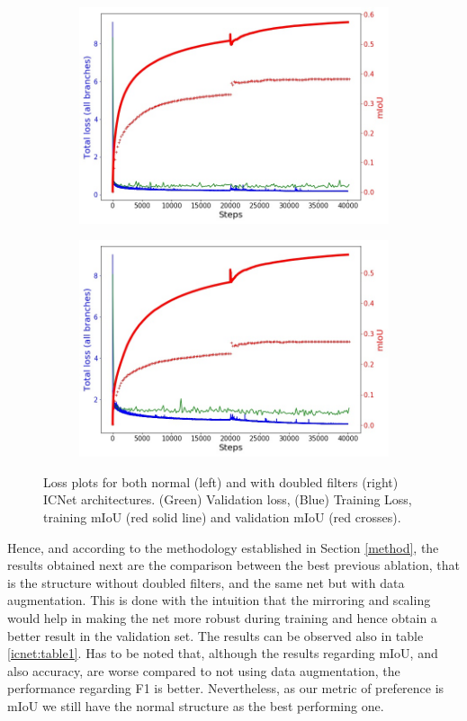 \documentclass[12pt,a4paper]{article}
\begin{document}
\begin{figure}
\centering
\begin{subfigure}{.5\textwidth}
  \centering
  \includegraphics[width=.95\linewidth]{icnet_res_1.jpg}
\end{subfigure}%
\begin{subfigure}{.5\textwidth}
  \centering
  \includegraphics[width=.95\linewidth]{icnet_res_2.jpg}
\end{subfigure}
\caption{Loss plots for both normal (left) and with doubled filters (right) ICNet architectures. (Green) Validation loss, (Blue) Training Loss,  training mIoU (red solid line) and validation mIoU (red crosses). }
\label{icnet:filters}
\end{figure}

Hence, and according to the methodology established in Section \ref{method}, the results obtained next are the comparison between the best previous ablation, that is the structure without doubled filters, and the same net but with data augmentation. This is done with the intuition that the mirroring and scaling would help in making the net more robust during training and hence obtain a better result in the validation set. The results can be observed also in table \ref{icnet:table1}. Has to be noted that, although the results regarding mIoU, and also accuracy, are worse compared to not using data augmentation, the performance regarding F1 is better. Nevertheless, as our metric of preference is mIoU we still have the normal structure as the best performing one.\newline
\end{document}
